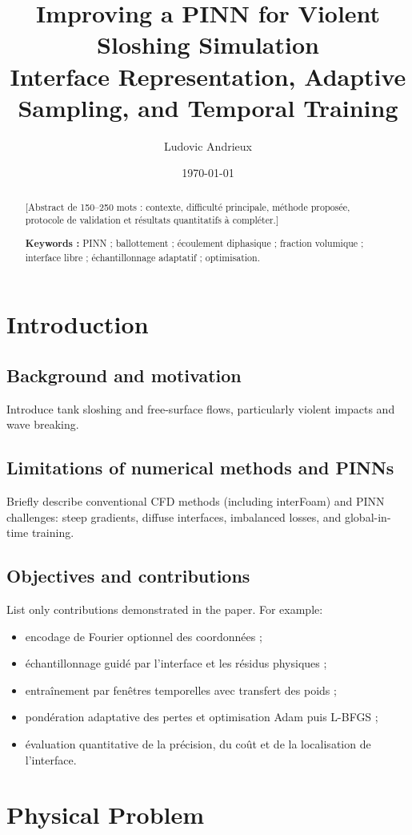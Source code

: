 \documentclass[11pt,a4paper]{article}
\title{Improving a PINN for Violent Sloshing Simulation\\
\large Interface Representation, Adaptive Sampling, and Temporal Training}
\author{Ludovic Andrieux}
\date{\today}
\begin{document}
\maketitle

\begin{abstract}
[Abstract de 150--250 mots : contexte, difficulté principale, méthode proposée, protocole de validation et résultats quantitatifs à compléter.]
\par\noindent\textbf{Keywords :} PINN ; ballottement ; écoulement diphasique ; fraction volumique ; interface libre ; échantillonnage adaptatif ; optimisation.
\end{abstract}

\section{Introduction}
\subsection{Background and motivation}
Introduce tank sloshing and free-surface flows, particularly violent impacts and wave breaking.
\subsection{Limitations of numerical methods and PINNs}
Briefly describe conventional CFD methods (including interFoam) and PINN challenges: steep gradients, diffuse interfaces, imbalanced losses, and global-in-time training.
\subsection{Objectives and contributions}
List only contributions demonstrated in the paper. For example:
\begin{itemize}[nosep]
  \item encodage de Fourier optionnel des coordonnées ;
  \item échantillonnage guidé par l'interface et les résidus physiques ;
  \item entraînement par fenêtres temporelles avec transfert des poids ;
  \item pondération adaptative des pertes et optimisation Adam puis L-BFGS ;
  \item évaluation quantitative de la précision, du coût et de la localisation de l'interface.
\end{itemize}

\section{Physical Problem}
\end{document}
